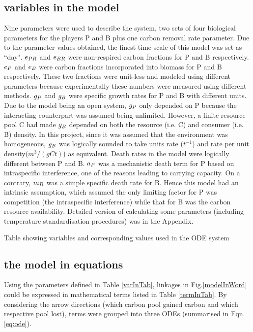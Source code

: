 \documentclass[../thesis.tex]{subfiles} %
\begin{document}
\subsection{variables in the model}
Nine parameters were used to describe the system, two sets of four biological parameters for the players P and B plus one carbon removal rate parameter.  Due to the parameter values obtained, the finest time scale of this model was set as ``day".  $e_{PR}$ and $e_{BR}$ were non-respired carbon fractions for P and B respectively.  $e_P$ and $e_B$ were carbon fractions incorporated into biomass for P and B respectively.  These two fractions were unit-less and modeled using different parameters because experimentally these numbers were measured using different methods.  $g_P$ and $g_B$ were specific growth rates for P and B with different units.  Due to the model being an open system, $g_P$ only depended on P because the interacting counterpart was assumed being unlimited.  However, a finite resource pool C had made $g_B$ depended on both the resource (i.e. C) and consumer (i.e. B) density.  In this project, since it was assumed that the environment was homogeneous, $g_B$ was logically sounded to take units rate ($t^{-1}$) and rate per unit density($m^3/(gCt)$) as equivalent.  Death rates in the model were logically different between P and B.  $a_P$ was a mechanistic death term for P based on intraspecific interference, one of the reasons leading to carrying capacity.  On a contrary, $m_B$ was a simple specific death rate for B.  Hence this model had an intrinsic assumption, which assumed the only limiting factor for P was competition (the intraspecific interference) while that for B was the carbon resource availability.  Detailed version of calculating some parameters (including temperature standardisation procedures) was in the Appendix.

\begin{table}[H]
    \centering
    \caption[Algebra variables]{Table showing variables and corresponding values used in the ODE system}
    \begin{tiny}
    \end{tiny}
    \label{varInTab}
\end{table}

\subsection{the model in equations}
Using the parameters defined in Table \ref{varInTab}, linkages in Fig.\ref{modelInWord} could be expressed in mathematical terms listed in Table \ref{termInTab}.  By considering the arrow directions (which carbon pool gained carbon and which respective pool lost), terms were grouped into three ODEs (summarised in Eqn.\ref{eq:ode}).
\end{document}

